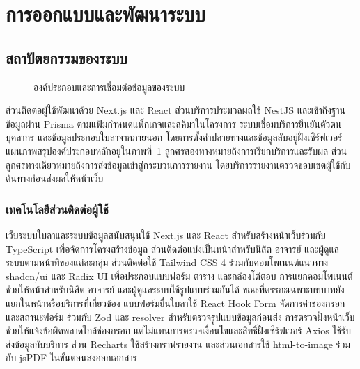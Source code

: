 \section{การออกแบบและพัฒนาระบบ}
\subsection{สถาปัตยกรรมของระบบ}
\begin{figure}[H]
\centering
{}
\caption{องค์ประกอบและการเชื่อมต่อข้อมูลของระบบ}\label{fig:architecture}
\end{figure}
ส่วนติดต่อผู้ใช้พัฒนาด้วย Next.js และ React ส่วนบริการประมวลผลใช้ NestJS และเข้าถึงฐานข้อมูลผ่าน Prisma ตามแฟ้มกำหนดแพ็กเกจและสคีมาในโครงการ ระบบเชื่อมบริการยืนยันตัวตน บุคลากร และข้อมูลประกอบใบลาจากภายนอก โดยการตั้งค่าปลายทางและข้อมูลลับอยู่ฝั่งเซิร์ฟเวอร์ แผนภาพสรุปองค์ประกอบหลักอยู่ในภาพที่~\ref{fig:architecture} ลูกศรสองทางหมายถึงการเรียกบริการและรับผล ส่วนลูกศรทางเดียวหมายถึงการส่งข้อมูลเข้าสู่กระบวนการรายงาน โดยบริการรายงานตรวจขอบเขตผู้ใช้กับต้นทางก่อนส่งผลให้หน้าเว็บ

\subsubsection{เทคโนโลยีส่วนติดต่อผู้ใช้}
เว็บระบบใบลาและระบบข้อมูลสนับสนุนใช้ Next.js และ React สำหรับสร้างหน้าเว็บร่วมกับ TypeScript เพื่อจัดการโครงสร้างข้อมูล ส่วนติดต่อแบ่งเป็นหน้าสำหรับนิสิต อาจารย์ และผู้ดูแลระบบตามหน้าที่ของแต่ละกลุ่ม \cite{repo}
ส่วนติดต่อใช้ Tailwind CSS 4 ร่วมกับคอมโพเนนต์แนวทาง shadcn/ui และ Radix UI เพื่อประกอบแบบฟอร์ม ตาราง และกล่องโต้ตอบ การแยกคอมโพเนนต์ช่วยให้หน้าสำหรับนิสิต อาจารย์ และผู้ดูแลระบบใช้รูปแบบร่วมกันได้ ขณะที่ตรรกะเฉพาะบทบาทยังแยกในหน้าหรือบริการที่เกี่ยวข้อง
แบบฟอร์มยื่นใบลาใช้ React Hook Form จัดการค่าช่องกรอกและสถานะฟอร์ม ร่วมกับ Zod และ resolver สำหรับตรวจรูปแบบข้อมูลก่อนส่ง การตรวจฝั่งหน้าเว็บช่วยให้แจ้งข้อผิดพลาดใกล้ช่องกรอก แต่ไม่แทนการตรวจเงื่อนไขและสิทธิ์ฝั่งเซิร์ฟเวอร์ Axios ใช้รับส่งข้อมูลกับบริการ ส่วน Recharts ใช้สร้างกราฟรายงาน และส่วนเอกสารใช้ html-to-image ร่วมกับ jsPDF ในขั้นตอนส่งออกเอกสาร
